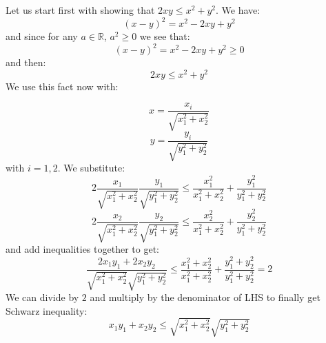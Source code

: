 \documentclass{article}
\begin{document}
Let us start first with showing that \(2xy \leq x^{2} + y^{2}\). We have:
\begin{equation*}
	(x - y)^{2} = x^{2} - 2xy + y^{2}
\end{equation*}
and since for any \(a \in \mathbb{R}\), \(a^{2} \geq 0\) we see that:
\begin{equation*}
	(x - y)^{2} = x^{2} - 2xy + y^{2} \geq 0
\end{equation*}
and then:
\begin{equation*}
	2xy \leq x^{2} + y^{2}
\end{equation*}
We use this fact now with:

\begin{equation*}
	x = \frac{x_i}{\sqrt{x_{1}^{2} + x_{2}^{2}}}
\end{equation*}
\begin{equation*}
	y = \frac{y_i}{\sqrt{y_{1}^{2} + y_{2}^{2}}}
\end{equation*}
with \(i=1,2\). We substitute:
\begin{equation*}
	2 \frac{x_1}{\sqrt{x_{1}^{2} + x_{2}^{2}}} \frac{y_1}{\sqrt{y_{1}^{2} + y_{2}^{2}}} \leq \frac{x_{1}^{2}}{x_{1}^{2} + x_{2}^{2}} + \frac{y_{1}^{2}}{y_{1}^{2} + y_{2}^{2}}
\end{equation*}
\begin{equation*}
	2 \frac{x_2}{\sqrt{x_{1}^{2} + x_{2}^{2}}} \frac{y_2}{\sqrt{y_{1}^{2} + y_{2}^{2}}} \leq \frac{x_{2}^{2}}{x_{1}^{2} + x_{2}^{2}} + \frac{y_{2}^{2}}{y_{1}^{2} + y_{2}^{2}}
\end{equation*}
and add inequalities together to get:
\begin{equation*}
	\frac{2x_{1}y_{1} + 2x_{2}y_{2}}{\sqrt{x_{1}^{2} + x_{2}^{2}}\sqrt{y_{1}^{2} + y_{2}^{2}}} \leq \frac{x_{1}^{2} + x_{2}^{2}}{{x_{1}^{2} + x_{2}^{2}}} + \frac{y_{1}^{2} + y_{2}^{2}}{y_{1}^{2} + y_{2}^{2}} = 2
\end{equation*}
We can divide by \(2\) and multiply by the denominator of LHS to finally get Schwarz inequality:
\begin{equation*}
	x_{1}y_{1} + x_{2}y_{2} \leq \sqrt{x_{1}^{2} + x_{2}^{2}} \sqrt{y_{1}^{2} + y_{2}^{2}}
\end{equation*}
\end{document}
